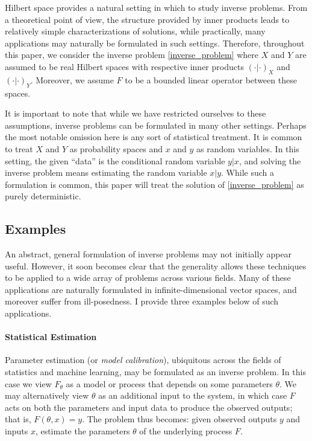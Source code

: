 \documentclass[12pt]{article}
\begin{document}
Hilbert space provides a natural setting in which to study inverse problems. From a theoretical point of view, the structure provided by 
inner products leads to relatively simple characterizations of solutions, while practically, many applications may 
naturally be formulated in such settings. Therefore, throughout this paper, we consider the inverse problem \eqref{inverse_problem}
where $X$ and $Y$ are assumed to be real Hilbert spaces with respective inner products $(\cdot | \cdot)_X$ and $(\cdot | \cdot)_Y$. 
Moreover, we assume $F$ to be a bounded linear operator between these spaces. 

It is important to note that while we have restricted ourselves to these assumptions, inverse problems can be formulated in many 
other settings. Perhaps the most notable omission here is any sort of statistical treatment. It is common to treat $X$ and $Y$ as
probability spaces and $x$ and $y$ as random variables. In this setting, the given ``data'' is the conditional random variable 
$y|x$, and solving the inverse problem means estimating the random variable $x|y$. While such a formulation is common, this 
paper will treat the solution of \eqref{inverse_problem} as purely deterministic.  

 \subsection{Examples}
 
 An abstract, general formulation of inverse problems may not initially appear useful. 
 However, it soon becomes clear that the generality allows these techniques to be 
 applied to a wide array of problems across various fields. Many of these applications 
 are naturally formulated in infinite-dimensional vector spaces, and moreover suffer from
  ill-posedness. I provide three examples below of such applications. 
 
 \paragraph*{Statistical Estimation}
 Parameter estimation (or \textit{model calibration}), ubiquitous across the fields of statistics 
 and machine learning, may be formulated as an inverse problem. In this case we view 
 $F_\theta$ as a model or process that depends on some parameters $\theta$. We may
  alternatively view $\theta$ as an additional input to the system, in which case $F$ acts 
  on both the parameters and input data to produce the observed outputs; that is, 
  $F(\theta, x) = y$. The problem thus becomes: given observed outputs $y$ and inputs $x$, 
  estimate the parameters $\theta$ of the underlying process $F$. 
  
\end{document}
